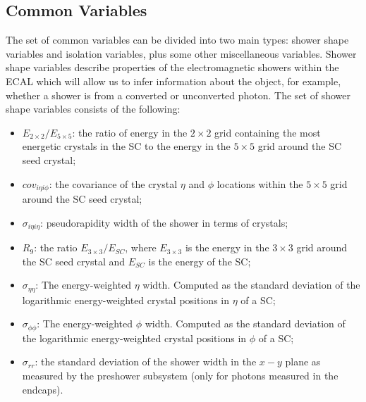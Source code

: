 \subsection{Common Variables}
The set of common variables can be divided into two main types: shower shape variables and isolation variables, plus some other miscellaneous variables. 
Shower shape variables describe properties of the electromagnetic showers within the ECAL which will allow us to infer information about the object, for example, whether a shower is from a converted or unconverted photon.
The set of shower shape variables consists of the following:
\begin{itemize}[noitemsep]
    \item $E_{2\times{}2}/E_{5\times{}5}$: the ratio of energy in the $2\times{}2$ grid containing the most energetic crystals in the SC to the energy in the $5\times{}5$ grid around the SC seed crystal;
    \item $cov_{i\eta{i}\phi}$: the covariance of the crystal $\eta$ and $\phi$ locations within the $5\times{}5$ grid around the SC seed crystal; 
    \item $\sigma_{i\eta{}i\eta}$: pseudorapidity width of the shower in terms of crystals; 
    \item $R_{9}$: the ratio $E_{3\times{}3}/E_{SC}$, where $E_{3\times{}3}$ is the energy in the $3\times{}3$ grid around the SC seed crystal and $E_{SC}$ is the energy of the SC;
    \item $\sigma_{\eta\eta}$: The energy-weighted $\eta$ width. Computed as the standard deviation of the logarithmic energy-weighted crystal positions in $\eta$ of a SC;
    \item $\sigma_{\phi\phi}$: The energy-weighted $\phi$ width. Computed as the standard deviation of the logarithmic energy-weighted crystal positions in $\phi$ of a SC;
    \item $\sigma_{rr}$: the standard deviation of the shower width in the $x-y$ plane as measured by the preshower subsystem (only for photons measured in the endcaps).
\end{itemize}



